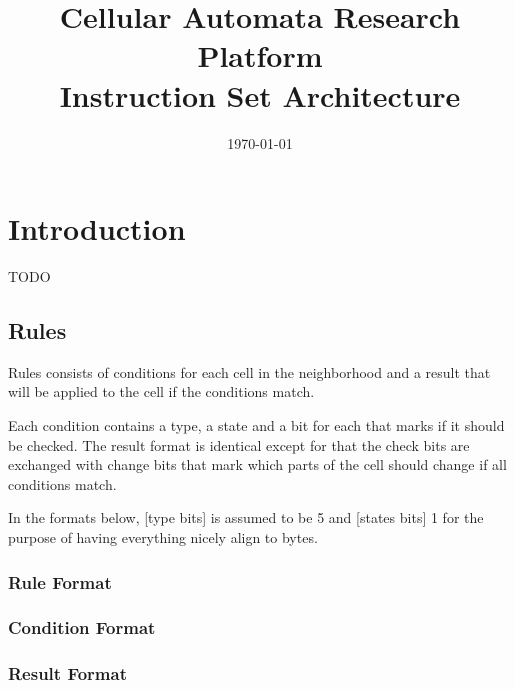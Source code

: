 \documentclass[a4paper]{article}
\title{Cellular Automata Research Platform\\Instruction Set Architecture}
\date{\today}
\begin{document}
\maketitle

\tableofcontents

\newpage

\setcounter{page}{1}

\section{Introduction}

TODO

\newpage
\subsection{Rules}

Rules consists of conditions for each cell in the neighborhood and a result that will be applied to the cell if the conditions match.

Each condition contains a type, a state and a bit for each that marks if it should be checked.
The result format is identical except for that the check bits are exchanged with change bits that mark which parts of the cell should change if all conditions match.

In the formats below, [type bits] is assumed to be 5 and [states bits] 1 for the purpose of having everything nicely align to bytes.

\subsubsection*{Rule Format}


\subsubsection*{Condition Format}


\subsubsection*{Result Format}


\notes
\end{document}
